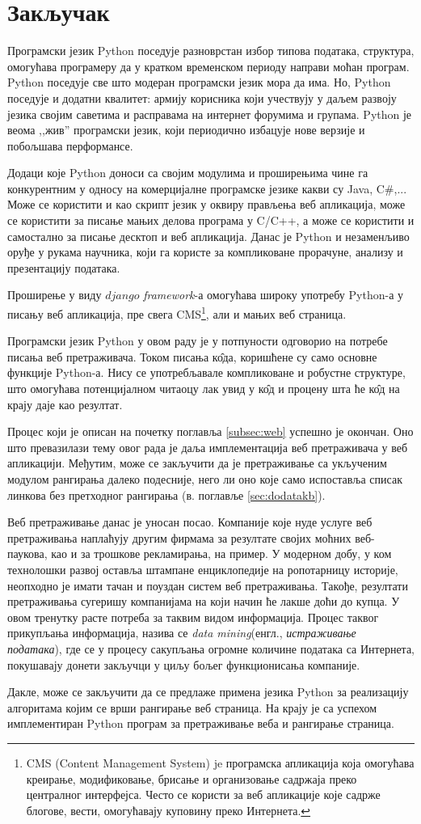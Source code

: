 \section{Закључак}

Програмски језик Python поседује разноврстан избор типова података, структура, омогућава програмеру да у кратком временском периоду направи моћан програм. Python поседује све што модеран програмски језик мора да има. Но, Python поседује  и додатни квалитет: армију корисника који учествују у даљем развоју језика својим саветима и расправама на интернет форумима и групама. Python је веома ,,жив'' програмски језик, који периодично избацује нове верзије и побољшава перформансе.

Додаци које Python доноси са својим модулима и проширењима чине га конкурентним у односу на комерцијалне програмске језике какви су Java, C\#,... Може се користити и као скрипт језик у оквиру прављења веб апликација, може се користити за писање мањих делова програма у C/C++, а може се користити и самостално за писање десктоп и веб апликација. Данас је Python и незаменљиво оруђе у рукама научника, који га користе за компликоване прорачуне, анализу и презентацију података.

Проширење у виду $django$ \emph{framework}-а\cite{django} омогућава широку употребу Python-а у писању веб апликација, пре свега CMS\footnote{CMS (Content Management System) je програмска апликација која омогућава креирање, модификовање, брисање и организовање садржаја преко централног интерфејса. Често се користи за веб апликације које садрже блогове, вести, омогућавају куповину преко Интернета.}, али и мањих веб страница.

Програмски језик Python у овом раду је у потпуности одговорио на потребе писања веб претраживача. Током писања к\^{о}да, коришћене су само основне функције Python-а. Нису се употребљавале компликоване и робустне структуре, што омогућава потенцијалном читаоцу лак увид у к\^{о}д и процену шта ће к\^{о}д на крају даје као резултат.

Процес који је описан на почетку поглавља \ref{subsec:web} успешно је окончан. Оно што превазилази тему овог рада је даља имплементација веб претраживача у веб апликацији. Међутим, може се закључити да је претраживање са укљученим модулом рангирања далеко подесније, него ли оно које само испоставља списак линкова без претходног рангирања (в. поглавље \ref{sec:dodatakb}).

Веб претраживање данас је уносан посао. Компаније које нуде услуге веб претраживања наплаћују другим фирмама за резултате својих моћних веб-паукова, као и за трошкове рекламирања, на пример. У модерном добу, у ком технолошки развој оставља штампане енциклопедије на ропотарницу историје, неопходно је имати тачан и поуздан систем веб претраживања. Такође, резултати претраживања сугеришу компанијама на који начин ће лакше доћи до купца. У овом тренутку расте потреба за таквим видом информација. Процес таквог прикупљања информација, назива се \emph{data mining}(енгл., \emph{истраживање података}), где се у процесу сакупљања огромне количине података са Интернета, покушавају донети закључци у циљу бољег функционисања компаније.

Дакле, може се закључити да се предлаже примена језика Python за реализацију алгоритама којим се врши рангирање веб страница. На крају је са успехом имплементиран Python програм за претраживање веба и рангирање страница.
